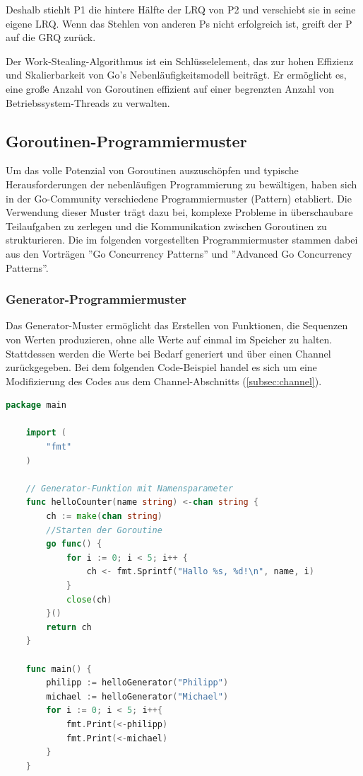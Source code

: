 \documentclass[fontsize=12pt,paper=a4,twoside=semi,parskip=half-,headsepline,headinclude]{scrreprt}
\begin{document}
Deshalb stiehlt P1 die hintere Hälfte der LRQ von P2 und verschiebt sie in seine eigene LRQ. Wenn das Stehlen von anderen Ps nicht erfolgreich ist, greift der P auf die GRQ zurück.

Der Work-Stealing-Algorithmus ist ein Schlüsselelement, das zur hohen Effizienz und Skalierbarkeit von Go's Nebenläufigkeitsmodell beiträgt. Er ermöglicht es, eine große Anzahl von Goroutinen effizient auf einer begrenzten Anzahl von Betriebssystem-Threads zu verwalten.

\subsection{Goroutinen-Programmiermuster}

Um das volle Potenzial von Goroutinen auszuschöpfen und typische Herausforderungen der nebenläufigen Programmierung zu bewältigen, haben sich in der Go-Community verschiedene Programmiermuster (Pattern) etabliert. Die Verwendung dieser Muster trägt dazu bei, komplexe Probleme in überschaubare Teilaufgaben zu zerlegen und die Kommunikation zwischen Goroutinen zu strukturieren. Die im folgenden vorgestellten Programmiermuster stammen dabei aus den Vorträgen ''Go Concurrency Patterns''\cite{Pike2012} und ''Advanced Go Concurrency Patterns''\cite{Ajmani2013}.

\subsubsection{Generator-Programmiermuster}
\label{subsubsec:generator}

Das Generator-Muster ermöglicht das Erstellen von Funktionen, die Sequenzen von Werten produzieren, ohne alle Werte auf einmal im Speicher zu halten. Stattdessen werden die Werte bei Bedarf generiert und über einen Channel zurückgegeben. Bei dem folgenden Code-Beispiel handel es sich um eine Modifizierung des Codes aus dem Channel-Abschnitts (\ref{subsec:channel}).

\begin{lstlisting}[language=Go,extendedchars=true]
	package main
	
	import (
		"fmt"
	)

	// Generator-Funktion mit Namensparameter
	func helloCounter(name string) <-chan string {
		ch := make(chan string)
		//Starten der Goroutine
		go func() {
			for i := 0; i < 5; i++ {
				ch <- fmt.Sprintf("Hallo %s, %d!\n", name, i)
			}
			close(ch)
		}()
		return ch
	}

	func main() {
		philipp := helloGenerator("Philipp")
		michael := helloGenerator("Michael")
		for i := 0; i < 5; i++{
			fmt.Print(<-philipp)
			fmt.Print(<-michael)
		}
	}
\end{lstlisting}
\end{document}
